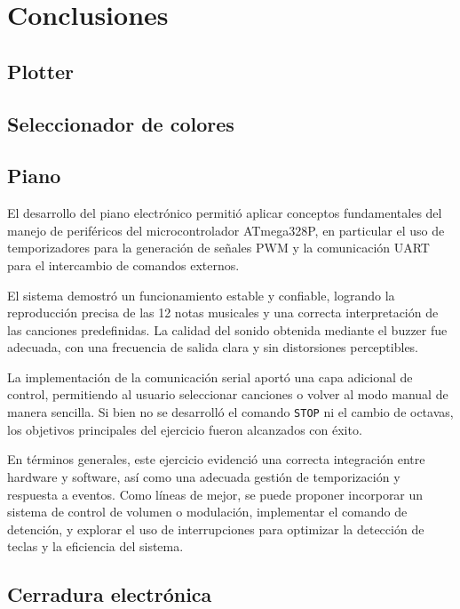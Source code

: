 
\section{Conclusiones}

\subsection{Plotter}

\subsection{Seleccionador de colores}

\subsection{Piano}
El desarrollo del piano electrónico permitió aplicar conceptos fundamentales del manejo de periféricos del microcontrolador ATmega328P, en particular el uso de temporizadores para la generación de señales PWM y la comunicación UART para el intercambio de comandos externos.  

El sistema demostró un funcionamiento estable y confiable, logrando la reproducción precisa de las 12 notas musicales y una correcta interpretación de las canciones predefinidas. La calidad del sonido obtenida mediante el buzzer fue adecuada, con una frecuencia de salida clara y sin distorsiones perceptibles.  

La implementación de la comunicación serial aportó una capa adicional de control, permitiendo al usuario seleccionar canciones o volver al modo manual de manera sencilla. Si bien no se desarrolló el comando \texttt{STOP} ni el cambio de octavas, los objetivos principales del ejercicio fueron alcanzados con éxito.  

En términos generales, este ejercicio evidenció una correcta integración entre hardware y software, así como una adecuada gestión de temporización y respuesta a eventos. Como líneas de mejor, se puede proponer incorporar un sistema de control de volumen o modulación, implementar el comando de detención, y explorar el uso de interrupciones para optimizar la detección de teclas y la eficiencia del sistema.

\subsection{Cerradura electrónica}
